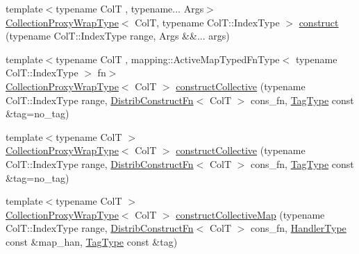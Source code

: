 \begin{DoxyCompactItemize}
\item 
{\footnotesize template$<$typename ColT , typename... Args$>$ }\\\hyperlink{structvt_1_1vrt_1_1collection_1_1_collection_manager_a56458ed7f9bb22b631b9b3a745f42f94}{Collection\+Proxy\+Wrap\+Type}$<$ ColT, typename Col\+T\+::\+Index\+Type $>$ \hyperlink{structvt_1_1vrt_1_1collection_1_1_collection_manager_a9049432725068d7ec7f664f7a8759a69}{construct} (typename Col\+T\+::\+Index\+Type range, Args \&\&... args)
\item 
{\footnotesize template$<$typename ColT , mapping\+::\+Active\+Map\+Typed\+Fn\+Type$<$ typename Col\+T\+::\+Index\+Type $>$ fn$>$ }\\\hyperlink{structvt_1_1vrt_1_1collection_1_1_collection_manager_a56458ed7f9bb22b631b9b3a745f42f94}{Collection\+Proxy\+Wrap\+Type}$<$ ColT $>$ \hyperlink{structvt_1_1vrt_1_1collection_1_1_collection_manager_a619d6e576f0d108e442b16ca4f68f1f3}{construct\+Collective} (typename Col\+T\+::\+Index\+Type range, \hyperlink{structvt_1_1vrt_1_1collection_1_1_collection_manager_a7503830bc133013d542856fa39834dcc}{Distrib\+Construct\+Fn}$<$ ColT $>$ cons\+\_\+fn, \hyperlink{namespacevt_a84ab281dae04a52a4b243d6bf62d0e52}{Tag\+Type} const \&tag=no\+\_\+tag)
\item 
{\footnotesize template$<$typename ColT $>$ }\\\hyperlink{structvt_1_1vrt_1_1collection_1_1_collection_manager_a56458ed7f9bb22b631b9b3a745f42f94}{Collection\+Proxy\+Wrap\+Type}$<$ ColT $>$ \hyperlink{structvt_1_1vrt_1_1collection_1_1_collection_manager_ad68e773af13eaa96e58910b14264e8cb}{construct\+Collective} (typename Col\+T\+::\+Index\+Type range, \hyperlink{structvt_1_1vrt_1_1collection_1_1_collection_manager_a7503830bc133013d542856fa39834dcc}{Distrib\+Construct\+Fn}$<$ ColT $>$ cons\+\_\+fn, \hyperlink{namespacevt_a84ab281dae04a52a4b243d6bf62d0e52}{Tag\+Type} const \&tag=no\+\_\+tag)
\item 
{\footnotesize template$<$typename ColT $>$ }\\\hyperlink{structvt_1_1vrt_1_1collection_1_1_collection_manager_a56458ed7f9bb22b631b9b3a745f42f94}{Collection\+Proxy\+Wrap\+Type}$<$ ColT $>$ \hyperlink{structvt_1_1vrt_1_1collection_1_1_collection_manager_ae4f96ce01b13d68e5f3a8be7bea7e439}{construct\+Collective\+Map} (typename Col\+T\+::\+Index\+Type range, \hyperlink{structvt_1_1vrt_1_1collection_1_1_collection_manager_a7503830bc133013d542856fa39834dcc}{Distrib\+Construct\+Fn}$<$ ColT $>$ cons\+\_\+fn, \hyperlink{namespacevt_af64846b57dfcaf104da3ef6967917573}{Handler\+Type} const \&map\+\_\+han, \hyperlink{namespacevt_a84ab281dae04a52a4b243d6bf62d0e52}{Tag\+Type} const \&tag)

\end{DoxyCompactItemize}
